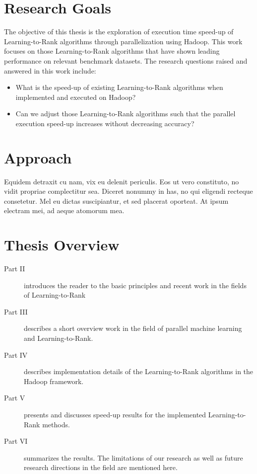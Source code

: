 \chapter{Research Goals}
The objective of this thesis is the exploration of execution time speed-up of Learning-to-Rank algorithms through parallelization using Hadoop. 
This work focuses on those Learning-to-Rank algorithms that have shown leading performance on relevant benchmark datasets.
The research questions raised and answered in this work include:
\begin{itemize}
\item What is the speed-up of existing Learning-to-Rank algorithms when implemented and executed on Hadoop?
\item Can we adjust those Learning-to-Rank algorithms such that the parallel execution speed-up increases without decreasing accuracy?
\end{itemize}

\chapter{Approach}
Equidem detraxit cu nam, vix eu delenit periculis. Eos ut vero
constituto, no vidit propriae complectitur sea. Diceret nonummy in
has, no qui eligendi recteque consetetur. Mel eu dictas suscipiantur,
et sed placerat oporteat. At ipsum electram mei, ad aeque atomorum
mea.

\chapter{Thesis Overview}

\begin{description}
\item[Part II ]{introduces the reader to the basic principles and recent work in the fields of Learning-to-Rank}
\item[Part III ]{describes a short overview work in the field of parallel machine learning and Learning-to-Rank.}
\item[Part IV ]{describes implementation details of the Learning-to-Rank algorithms in the Hadoop framework.}
\item[Part V ]{presents and discusses speed-up results for the implemented Learning-to-Rank methods.}
\item[Part VI ]{summarizes the results. The limitations of our research as well as future research directions in the field are mentioned here.}
\end{description}